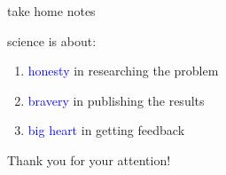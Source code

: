 \documentclass[10pt]{beamer}
\begin{document}
\begin{frame}{take home notes}

\begin{center}science is about:\end{center}

\begin{center}
\begin{enumerate}
	\item \textcolor{blue}{honesty} in researching the problem
	\item \textcolor{blue}{bravery} in publishing the results 
    \item \textcolor{blue}{big heart} in getting feedback 
\end{enumerate}
\end{center}
\end{frame}

\begin{frame}[standout]
\begin{center}
Thank you for your attention!
\end{center}
\end{frame}
\end{document}
